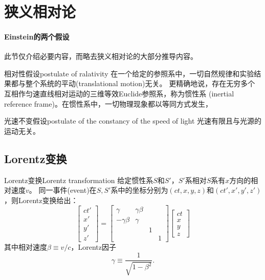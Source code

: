 \section{狭义相对论}

\paragraph{Einstein的两个假设}

此节仅介绍必要内容，而略去狭义相对论的大部分推导内容。%

\begin{theorem}
    {相对性假设}{postulate of ralativity}
    在一个给定的参照系中，一切自然规律和实验结果都与整个系统的平动(translational motion)无关。
    更精确地说，存在无穷多个互相作匀速直线相对运动的三维等效Euclide参照系，称为惯性系
    (inertial reference frame)。在惯性系中，一切物理现象都以等同方式发生，
\end{theorem}

\begin{theorem}
    {光速不变假设}{postulate of the constancy of the speed of light}
    光速有限且与光源的运动无关。
\end{theorem}

\subsection{Lorentz变换}

\begin{theorem}
    {Lorentz变换}{Lorentz transformation}
    给定惯性系$S$和$S'$，$S'$系相对$S$系有$x$方向的相对速度$v$。
    同一事件(event)在$S,S'$系中的坐标分别为$(ct,x,y,z)$和$(ct',x',y',z')$，则Lorentz变换给出：
    \begin{equation}
    	\begin{bmatrix}
    		ct'\\x'\\y'\\z'
    	\end{bmatrix}=
    	\begin{bmatrix}
    		\gamma&\gamma\beta\\-\gamma\beta&\gamma\\ &&1\\ &&&1
    	\end{bmatrix}
    	\begin{bmatrix}
    		ct\\x\\y\\z
    	\end{bmatrix}
    \end{equation}
    其中相对速度$\beta\equiv v/c$，Lorentz因子
    \[
        \gamma\equiv\frac1{\sqrt{1-\beta^2}}.
    \]
\end{theorem}

